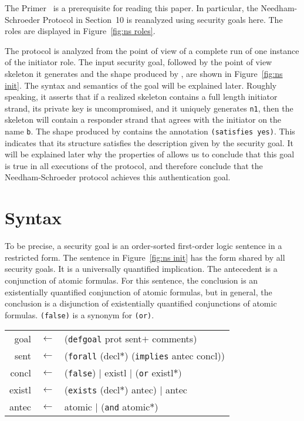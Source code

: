\documentclass[12pt]{article}
\newcommand{\sym}[1]{\textup{\texttt{#1}}}
\begin{document}
The {\cpsa} Primer~\cite{cpsaprimer09} is a prerequisite for reading
this paper.  In particular, the Needham-Schroeder Protocol in
Section~10 is reanalyzed using security goals here.  The roles are
displayed in Figure~\ref{fig:ns roles}.

The protocol is analyzed from the point of view of a complete run of
one instance of the initiator role.  The input security goal, followed
by the point of view skeleton it generates and the shape produced by
{\cpsa}, are shown in Figure~\ref{fig:ns init}.  The syntax and
semantics of the goal will be explained later.  Roughly speaking, it
asserts that if a realized skeleton contains a full length initiator
strand, its private key is uncompromised, and it uniquely generates
\texttt{n1}, then the skeleton will contain a responder strand that
agrees with the initiator on the name \texttt{b}.  The shape produced
by {\cpsa} contains the annotation \texttt{(satisfies yes)}.  This
indicates that its structure satisfies the description given by the
security goal.  It will be explained later why the properties of
{\cpsa} allows us to conclude that this goal is true in all executions
of the protocol, and therefore conclude that the Needham-Schroeder
protocol achieves this authentication goal.

\section{Syntax}\label{sec:syntax}

To be precise, a security goal is an order-sorted first-order logic
sentence in a restricted form.  The sentence in Figure~\ref{fig:ns
  init} has the form shared by all security goals.  It is a universally
quantified implication.  The antecedent is a conjunction of atomic
formulas.  For this sentence, the conclusion is an existentially
quantified conjunction of atomic formulas, but in general, the
conclusion is a disjunction of existentially quantified conjunctions
of atomic formulas.  \sym{(false)} is a synonym for \sym{(or)}.

\begin{center}\scshape
  \begin{tabular}{rcl}
  goal&$\leftarrow$&(\sym{defgoal} prot sent$+$ comments)
  \\ sent&$\leftarrow$&(\sym{forall} (decl$\ast$) (\sym{implies} antec concl))
  \\ concl&$\leftarrow$&(\sym{false})
  $\mid$ existl $\mid$ (\sym{or} existl$\ast)$
  \\ existl&$\leftarrow$&(\sym{exists}
  (decl$\ast$) antec) $\mid$ antec
  \\ antec&$\leftarrow$&atomic $\mid$ (\sym{and} atomic$\ast$)
  \end{tabular}
\end{center}
\end{document}
